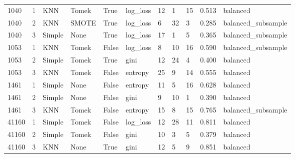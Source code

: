 \documentclass[11pt]{article}
\begin{document}
\begin{table}
\begin{tabularx}{22cm}{lllllllXXXX}
\midrule
1040 & 1 & KNN & Tomek & True & log\_loss & 12 & 1 & 15 & 0.513 & balanced \\
1040 & 2 & KNN & SMOTE & True & log\_loss & 6 & 32 & 3 & 0.285 & balanced\_subsample \\
1040 & 3 & Simple & None & True & log\_loss & 17 & 1 & 5 & 0.365 & balanced\_subsample \\
\midrule
1053 & 1 & KNN & Tomek & False & log\_loss & 8 & 10 & 16 & 0.590 & balanced\_subsample \\
1053 & 2 & Simple & Tomek & True & gini & 12 & 24 & 4 & 0.400 & balanced \\
1053 & 3 & KNN & Tomek & False & entropy & 25 & 9 & 14 & 0.555 & balanced \\
\midrule
1461 & 1 & Simple & None & False & entropy & 11 & 5 & 16 & 0.628 & balanced \\
1461 & 2 & Simple & None & False & gini & 9 & 10 & 1 & 0.390 & balanced \\
1461 & 3 & KNN & Tomek & False & entropy & 15 & 8 & 15 & 0.765 & balanced\_subsample \\
\midrule
41160 & 1 & Simple & Tomek & False & log\_loss & 12 & 28 & 11 & 0.811 & balanced \\
41160 & 2 & Simple & Tomek & False & gini & 10 & 3 & 5 & 0.379 & balanced \\
41160 & 3 & KNN & None & True & gini & 12 & 5 & 9 & 0.851 & balanced \\
\bottomrule
\end{tabularx}
\end{table}
\end{document}
